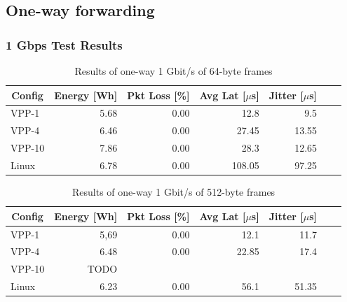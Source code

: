 \subsection{One-way forwarding}

\subsubsection{1 Gbps Test Results}

\begin{table}[h!]
\centering
\caption{Results of one-way 1 Gbit/s of 64-byte frames}
\begin{tabular}{|l|r|r|r|r|r|r|}
\hline
\multicolumn{1}{|c|}{\textbf{Config}} &
\multicolumn{1}{c|}{\textbf{Energy [Wh] }} &
\multicolumn{1}{c|}{\textbf{Pkt Loss [\%]}} &
\multicolumn{1}{c|}{\textbf{Avg Lat [$\mu$s]}} &
\multicolumn{1}{c|}{\textbf{Jitter [$\mu$s]}} \\
\hline 
VPP-1 & 5.68 & 0.00 & 12.8 & 9.5 \\
VPP-4 & 6.46 & 0.00 & 27.45 & 13.55 \\
VPP-10 & 7.86 & 0.00 & 28.3 & 12.65 \\
Linux & 6.78 & 0.00 & 108.05 & 97.25 \\
\hline
\end{tabular}
\label{tab:1udp:64B}
\end{table}


\begin{table}[h!]
\centering
\caption{Results of one-way 1 Gbit/s of 512-byte frames}
\begin{tabular}{|l|r|r|r|r|r|r|}
\hline
\multicolumn{1}{|c|}{\textbf{Config}} &
\multicolumn{1}{c|}{\textbf{Energy [Wh] }} &
\multicolumn{1}{c|}{\textbf{Pkt Loss [\%]}} &
\multicolumn{1}{c|}{\textbf{Avg Lat [$\mu$s]}} &
\multicolumn{1}{c|}{\textbf{Jitter [$\mu$s]}} \\
\hline 
VPP-1 & 5,69 & 0.00 & 12.1 & 11.7 \\
VPP-4 & 6.48 & 0.00 & 22.85 & 17.4 \\
VPP-10 & TODO &  &  &  \\
Linux & 6.23 & 0.00 & 56.1 & 51.35 \\
\hline
\end{tabular}
\label{tab:1udp:512B}
\end{table}


